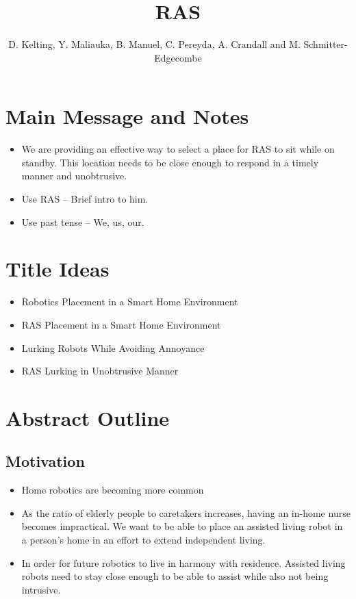 \documentclass[11pt, conference, a4paper]{IEEEtran}
\author{D. Kelting, Y. Maliauka, B. Manuel, C. Pereyda, A. Crandall and M. Schmitter-Edgecombe}
\title{RAS}
\begin{document}
\maketitle


\section{Main Message and Notes}
\begin{itemize}
	\item We are providing an effective way to select a place for RAS to sit while on standby. This location needs to be close enough to respond in a timely manner and unobtrusive.
	\item Use RAS -- Brief intro to him.
	\item Use past tense -- We, us, our.
\end{itemize}


\section{Title Ideas}
\begin{itemize}
	\item Robotics Placement in a Smart Home Environment
	\item RAS Placement in a Smart Home Environment 
	\item Lurking Robots While Avoiding Annoyance
	\item RAS Lurking in Unobtrusive Manner
	
\end{itemize}


\section{Abstract Outline}


\subsection{Motivation}
\begin{itemize}
    \item Home robotics are becoming more common
    \item As the ratio of elderly people to caretakers increases, having an 
        in-home nurse becomes impractical. We want to be able to place an assisted living robot 
        in a person's home in an effort to extend independent living.
    \item In order for future robotics to live in harmony with residence. Assisted living robots need 		to stay close enough to be able to assist while also not being intrusive. 
\end{itemize}
\end{document}
